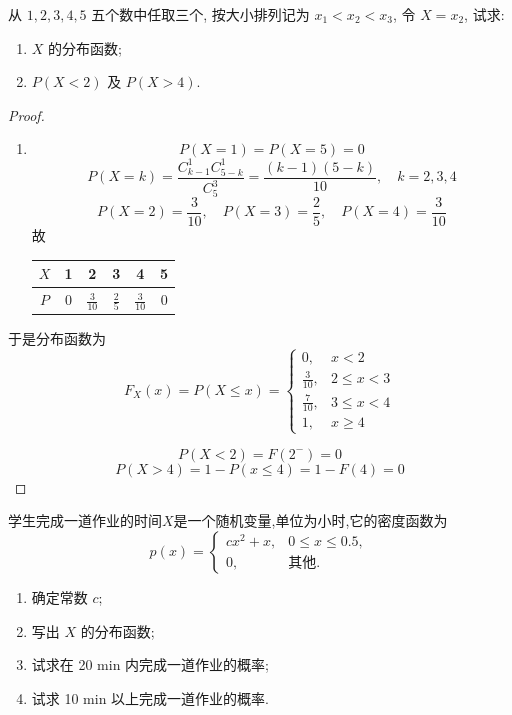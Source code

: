 \documentclass[../main.tex]{subfiles}
\begin{document}
\begin{exercise}{}{}
从 $1, 2, 3, 4, 5$ 五个数中任取三个, 按大小排列记为 $x_1 < x_2 < x_3$, 令 $X = x_2$, 试求:
\begin{enumerate}
    \item $X$ 的分布函数;
    \item $P(X < 2)$ 及 $P(X > 4)$.
\end{enumerate}
\end{exercise}
\begin{proof}
    \begin{enumerate}
        \item  \[
     P\left( X= 1 \right)= P\left( X= 5 \right)= 0  
     \]
    \[
    P\left( X= k \right)=\frac{ C_{k-1}^{1}C_{5-k}^{1}  }{C_{5}^{3} }=  \frac{\left( k-1 \right)\left( 5-k \right)   }{10 }  ,\quad k= 2,3,4
    \] \[
    P\left( X= 2 \right)= \frac{3 }{10 },\quad P\left( X= 3 \right)= \frac{2 }{5 },\quad P\left( X= 4 \right)= \frac{3 }{10 }     
    \]故 \begin{tabular}{|c|c|c|c|c|c|}

\(X\) & 1 & 2 & 3 & 4 & 5 \\
\hline
\(P\) & \(0\) & \(\frac{3 }{10 } \) & \(\frac{2 }{5 } \) & \(\frac{3 }{10 } \) & 0 \\

\end{tabular}
    \end{enumerate}
    于是分布函数为$$F_X(x) = P(X \le x) = 
\begin{cases}
0, & x < 2 \\
\frac{3}{10}, & 2 \le x < 3 \\
\frac{7}{10}, & 3 \le x < 4 \\
1, & x \ge 4
\end{cases}$$
\item \[
P\left( X< 2 \right)= F\left( 2^{-} \right)= 0  
\] \[
P\left( X> 4 \right)= 1-P\left( x\le 4 \right)= 1-F\left( 4 \right)= 0   
\]
\end{proof}
\begin{exercise}{}{}
学生完成一道作业的时间$X$是一个随机变量,单位为小时,它的密度函数为
\[ p(x) = \begin{cases} cx^2 + x, & 0 \le x \le 0.5, \\ 0, & \text{其他}. \end{cases} \]
\begin{enumerate}
\item[(1)] 确定常数 $c$;
\item[(2)] 写出 $X$ 的分布函数;
\item[(3)] 试求在 20 min 内完成一道作业的概率;
\item[(4)] 试求 10 min 以上完成一道作业的概率.
\end{enumerate}
\end{exercise}
\end{document}

